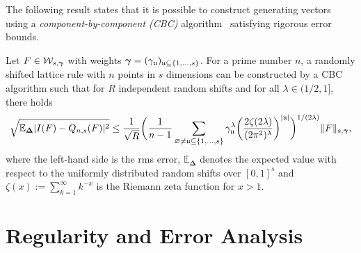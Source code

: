 \documentclass[graybox]{svmult}
\begin{document}
The following result states that it is possible to construct generating vectors using a \emph{component-by-component (CBC)} algorithm~\cite{cbc1,actanumer,cbc2} satisfying rigorous error bounds.
\begin{theorem}
Let $F \in \mathcal W_{s,{\boldsymbol{\gamma}}}$ with weights ${\boldsymbol{\gamma}}=(\gamma_{{\mathfrak{u}}})_{{\mathfrak{u}}\subseteq\{1,\ldots,s\}}$. For a prime number $n$, a randomly shifted lattice rule with $n$ points in $s$ dimensions can be constructed by a CBC algorithm such that for $R$ independent random shifts and for all $\lambda\in(1/2,1]$, there holds
$$
\sqrt{\mathbb E_{\boldsymbol\Delta}|I(F)-Q_{n, s}(F)|^2}\leq \frac{1}{\sqrt R}\bigg(\frac{1}{n-1}\sum_{\varnothing\neq{\mathfrak{u}}\subseteq\{1,\ldots,s\}}\gamma_{{\mathfrak{u}}}^{\lambda}\bigg(\frac{2\zeta(2\lambda)}{(2\pi^2)^\lambda}\bigg)^{|{\mathfrak{u}}|}\bigg)^{1/(2\lambda)}\|F\|_{s,{\boldsymbol{\gamma}}},
$$
where the left-hand side is the rms error, $\mathbb E_{\boldsymbol\Delta}$ denotes the expected value with respect to the uniformly distributed random shifts over $[0,1]^s$ and $\zeta(x):=\sum_{k=1}^\infty k^{-x}$ is the Riemann zeta function for $x>1$.
\end{theorem}

\section{Regularity and Error Analysis}\label{sec:parametricanalysis}
\end{document}
